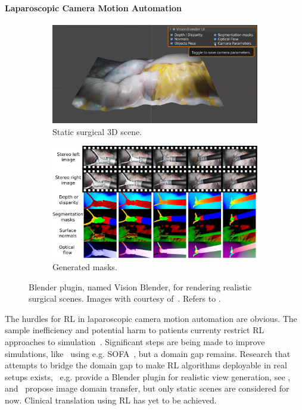 \paragraph{Laparoscopic Camera Motion Automation}
\begin{figure}[tb]
    \centering
    \begin{subfigure}[b]{0.49\textwidth}
        \includegraphics[width=\textwidth]{introduction/img/vision_blender_view.jpg}
        \caption{Static surgical 3D scene.}
    \end{subfigure}
    \begin{subfigure}[b]{0.49\textwidth}
        \includegraphics[width=\textwidth]{introduction/img/vision_blender_masks.jpg}
        \caption{Generated masks.}
    \end{subfigure}
    \caption{Blender plugin, named Vision Blender, for rendering realistic surgical scenes. Images with courtesy of~\cite{cartucho2021visionblender}. Refers to .}
    \label{in:fig:vision_blender}
\end{figure}
The hurdles for RL in laparoscopic camera motion automation are obvious. The sample inefficiency and potential harm to patients currenty restrict RL approaches to simulation~\cite{su2021multicamera,agrawal2018automating}. Significant steps are being made to improve simulations, like~\cite{scheikl2023lapgym} using e.g. SOFA~\cite{allard2007sofa}, but a domain gap remains. Research that attempts to bridge the domain gap to make RL algorithms deployable in real setups exists,~\cite{cartucho2021visionblender} e.g. provide a Blender plugin for realistic view generation, see , and~\cite{marzullo2021towards} propose image domain transfer, but only static scenes are considered for now. Clinical translation using RL has yet to be achieved.

